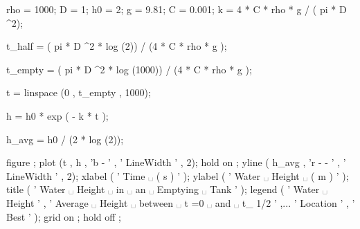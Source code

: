  rho = 1000; %
 D = 1; %
 h0 = 2; %
 g = 9.81; %
 C = 0.001; %
 k = 4 * C * rho * g / ( pi * D ^2);

 t_half = ( pi * D ^2 * log (2)) / (4 * C * rho * g );

 t_empty = ( pi * D ^2 * log (1000)) / (4 * C * rho * g );

 t = linspace (0 , t_empty , 1000);

 h = h0 * exp ( - k * t );

 h_avg = h0 / (2 * log (2)); %

 figure ;
 plot (t , h , ’b - ’ , ’ LineWidth ’ , 2); %
 hold on ;
 yline ( h_avg , ’r - - ’ , ’ LineWidth ’ , 2); %
 xlabel ( ’ Time ␣ ( s ) ’ );
 ylabel ( ’ Water ␣ Height ␣ ( m ) ’ );
 title ( ’ Water ␣ Height ␣ in ␣ an ␣ Emptying ␣ Tank ’ );
 legend ( ’ Water ␣ Height ’ , ’ Average ␣ Height ␣ between ␣ t =0 ␣ and ␣ t_ {1/2} ’ ,...
 ’ Location ’ , ’ Best ’ );
 grid on ;
 hold off ;


